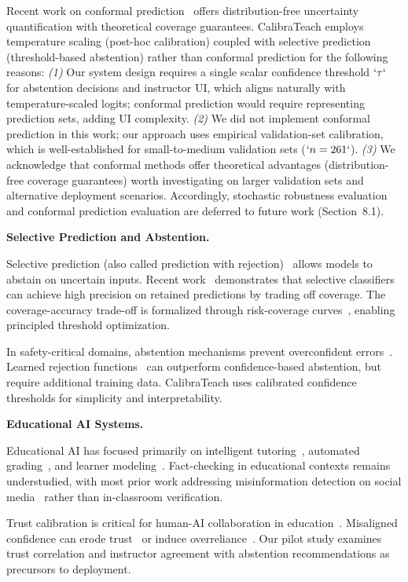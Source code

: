Recent work on conformal prediction~ offers distribution-free uncertainty quantification with theoretical coverage guarantees. CalibraTeach employs temperature scaling (post-hoc calibration) coupled with selective prediction (threshold-based abstention) rather than conformal prediction for the following reasons: \emph{(1)} Our system design requires a single scalar confidence threshold \(`\tau`\) for abstention decisions and instructor UI, which aligns naturally with temperature-scaled logits; conformal prediction would require representing prediction sets, adding UI complexity. \emph{(2)} We did not implement conformal prediction in this work; our approach uses empirical validation-set calibration, which is well-established for small-to-medium validation sets (\(`n=261`\)). \emph{(3)} We acknowledge that conformal methods offer theoretical advantages (distribution-free coverage guarantees) worth investigating on larger validation sets and alternative deployment scenarios. Accordingly, stochastic robustness evaluation and conformal prediction evaluation are deferred to future work (Section~8.1).

\textbf{Selective Prediction and Abstention.}

Selective prediction (also called prediction with rejection)~ allows models to abstain on uncertain inputs. Recent work~ demonstrates that selective classifiers can achieve high precision on retained predictions by trading off coverage. The coverage-accuracy trade-off is formalized through risk-coverage curves~, enabling principled threshold optimization.

In safety-critical domains, abstention mechanisms prevent overconfident errors~. Learned rejection functions~ can outperform confidence-based abstention, but require additional training data. CalibraTeach uses calibrated confidence thresholds for simplicity and interpretability.

\textbf{Educational AI Systems.}

Educational AI has focused primarily on intelligent tutoring~, automated grading~, and learner modeling~. Fact-checking in educational contexts remains understudied, with most prior work addressing misinformation detection on social media~ rather than in-classroom verification.

Trust calibration is critical for human-AI collaboration in education~. Misaligned confidence can erode trust~ or induce overreliance~. Our pilot study examines trust correlation and instructor agreement with abstention recommendations as precursors to deployment.

